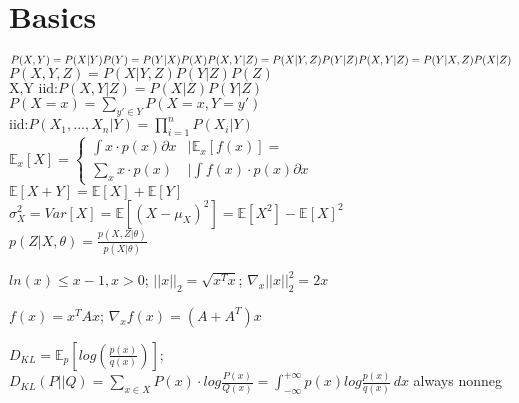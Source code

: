 \section*{Basics}
$P(X,Y)=P(X|Y)P(Y)=P(Y|X)P(X)\\
P(X,Y|Z)=P(X|Y,Z)P(Y|Z)\\
P(X,Y|Z)=P(Y|X,Z)P(X|Z)$\\
$P(X,Y,Z)=P(X|Y,Z)P(Y|Z)P(Z)$\\
$\text{X,Y iid:}P(X,Y|Z)=P(X|Z)P(Y|Z)$\\
$P(X=x)=\sum_{y'\in Y}P(X=x,Y=y')$\\
$\text{iid:}P(X_1,...,X_n|Y)=\prod_{i=1}^{n}P(X_i|Y)$\\
$\mathbb{E}_x[X] = \begin{cases}
\int x \cdot p(x) \partial x  &|\mathbb{E}_x[f(x)] =\\
\sum_x x \cdot p(x) &|\int f(x) \cdot p(x) \partial x
\end{cases}$\\
$\mathbb{E}[X+Y]=\mathbb{E}[X]+\mathbb{E}[Y]$\\
$\sigma_X^2=Var[X] = \mathbb{E}[(X-\mu_X)^2] = \mathbb{E}[X^2] - \mathbb{E}[X]^2$\\
$p(Z|X,\theta) = \frac{p(X,Z|\theta)}{p(X|\theta)}$



$ln(x) \leq x - 1, x>0$; $||x||_2 = \sqrt{x^T x}$; $\nabla_x ||x||_2^2 = 2 x$%

$f(x) = x^T A x$; $\nabla_x f(x) = (A + A^T) x$

$D_{KL} = \mathbb{E}_p[log(\frac{p(x)}{q(x)})]$; $D_{KL} (P||Q) = \sum_{x \in X}P(x) \cdot log \frac{P(x)}{Q(x)} =  \int_{-\infty}^{+\infty} p(x) log \frac{p(x)}{q(x)} \, dx $ always nonneg

